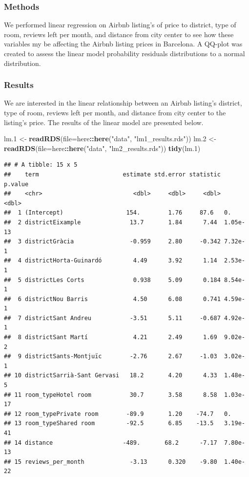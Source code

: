 \documentclass[]{article}
\newenvironment{Shaded}{\begin{snugshade}}{\end{snugshade}}
\newcommand{\DataTypeTok}[1]{\textcolor[rgb]{0.13,0.29,0.53}{#1}}
\newcommand{\FloatTok}[1]{\textcolor[rgb]{0.00,0.00,0.81}{#1}}
\newcommand{\KeywordTok}[1]{\textcolor[rgb]{0.13,0.29,0.53}{\textbf{#1}}}
\newcommand{\NormalTok}[1]{#1}
\newcommand{\OperatorTok}[1]{\textcolor[rgb]{0.81,0.36,0.00}{\textbf{#1}}}
\newcommand{\StringTok}[1]{\textcolor[rgb]{0.31,0.60,0.02}{#1}}
\begin{document}
\hypertarget{methods}{%
\subsubsection{Methods}\label{methods}}

We performed linear regression on Airbnb listing's of price to district,
type of room, reviews left per month, and distance from city center to
see how these variables my be affecting the Airbnb listing prices in
Barcelona. A QQ-plot was created to assess the linear model probability
residuals distributions to a normal distribution.

\hypertarget{results}{%
\subsubsection{Results}\label{results}}

We are interested in the linear relationship between an Airbnb listing's
district, type of room, reviews left per month, and distance from city
center to the listing's price. The results of the linear model are
presented below.

\begin{Shaded}
\begin{Highlighting}[]
\NormalTok{lm}\FloatTok{.1}\NormalTok{ <-}\StringTok{ }\KeywordTok{readRDS}\NormalTok{(}\DataTypeTok{file=}\NormalTok{here}\OperatorTok{::}\KeywordTok{here}\NormalTok{(}\StringTok{"data"}\NormalTok{, }\StringTok{"lm1_results.rds"}\NormalTok{))}
\NormalTok{lm}\FloatTok{.2}\NormalTok{ <-}\StringTok{ }\KeywordTok{readRDS}\NormalTok{(}\DataTypeTok{file=}\NormalTok{here}\OperatorTok{::}\KeywordTok{here}\NormalTok{(}\StringTok{"data"}\NormalTok{, }\StringTok{"lm2_results.rds"}\NormalTok{))}
\KeywordTok{tidy}\NormalTok{(lm}\FloatTok{.1}\NormalTok{)}
\end{Highlighting}
\end{Shaded}

\begin{verbatim}
## # A tibble: 15 x 5
##    term                        estimate std.error statistic  p.value
##    <chr>                          <dbl>     <dbl>     <dbl>    <dbl>
##  1 (Intercept)                  154.        1.76     87.6   0.      
##  2 districtEixample              13.7       1.84      7.44  1.05e-13
##  3 districtGràcia                -0.959     2.80     -0.342 7.32e- 1
##  4 districtHorta-Guinardó         4.49      3.92      1.14  2.53e- 1
##  5 districtLes Corts              0.938     5.09      0.184 8.54e- 1
##  6 districtNou Barris             4.50      6.08      0.741 4.59e- 1
##  7 districtSant Andreu           -3.51      5.11     -0.687 4.92e- 1
##  8 districtSant Martí             4.21      2.49      1.69  9.02e- 2
##  9 districtSants-Montjuïc        -2.76      2.67     -1.03  3.02e- 1
## 10 districtSarrià-Sant Gervasi   18.2       4.20      4.33  1.48e- 5
## 11 room_typeHotel room           30.7       3.58      8.58  1.03e-17
## 12 room_typePrivate room        -89.9       1.20    -74.7   0.      
## 13 room_typeShared room         -92.5       6.85    -13.5   3.19e-41
## 14 distance                    -489.       68.2      -7.17  7.80e-13
## 15 reviews_per_month             -3.13      0.320    -9.80  1.40e-22
\end{verbatim}
\end{document}
